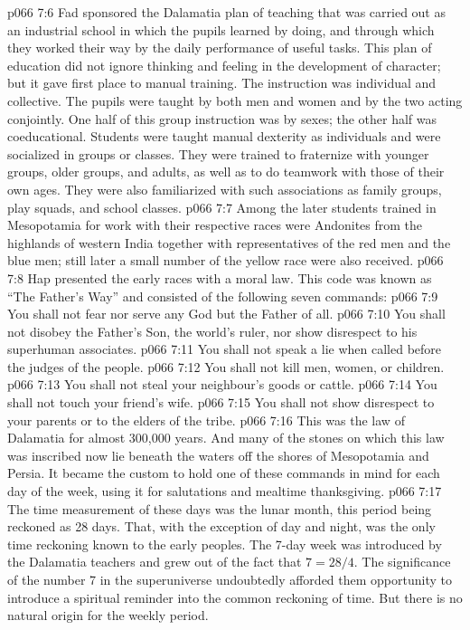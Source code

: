 \vs p066 7:6 \pc Fad sponsored the Dalamatia plan of teaching that was carried out as an industrial school in which the pupils learned by doing, and through which they worked their way by the daily performance of useful tasks. This plan of education did not ignore thinking and feeling in the development of character; but it gave first place to manual training. The instruction was individual and collective. The pupils were taught by both men and women and by the two acting conjointly. One half of this group instruction was by sexes; the other half was coeducational. Students were taught manual dexterity as individuals and were socialized in groups or classes. They were trained to fraternize with younger groups, older groups, and adults, as well as to do teamwork with those of their own ages. They were also familiarized with such associations as family groups, play squads, and school classes.
\vs p066 7:7 Among the later students trained in Mesopotamia for work with their respective races were Andonites from the highlands of western India together with representatives of the red men and the blue men; still later a small number of the yellow race were also received.
\vs p066 7:8 \pc Hap presented the early races with a moral law. This code was known as “The Father’s Way” and consisted of the following seven commands:
\vs p066 7:9 \bibnobreakspace You shall not fear nor serve any God but the Father of all.
\vs p066 7:10 \bibnobreakspace You shall not disobey the Father’s Son, the world’s ruler, nor show disrespect to his superhuman associates.
\vs p066 7:11 \bibnobreakspace You shall not speak a lie when called before the judges of the people.
\vs p066 7:12 \bibnobreakspace You shall not kill men, women, or children.
\vs p066 7:13 \bibnobreakspace You shall not steal your neighbour’s goods or cattle.
\vs p066 7:14 \bibnobreakspace You shall not touch your friend’s wife.
\vs p066 7:15 \bibnobreakspace You shall not show disrespect to your parents or to the elders of the tribe.
\vs p066 7:16 \pc This was the law of Dalamatia for almost 300,000 years. And many of the stones on which this law was inscribed now lie beneath the waters off the shores of Mesopotamia and Persia. It became the custom to hold one of these commands in mind for each day of the week, using it for salutations and mealtime thanksgiving.
\vs p066 7:17 \pc The time measurement of these days was the lunar month, this period being reckoned as 28 days. That, with the exception of day and night, was the only time reckoning known to the early peoples. The 7\hyp{}day week was introduced by the Dalamatia teachers and grew out of the fact that $7 = 28/4$. The significance of the number 7 in the superuniverse undoubtedly afforded them opportunity to introduce a spiritual reminder into the common reckoning of time. But there is no natural origin for the weekly period.
